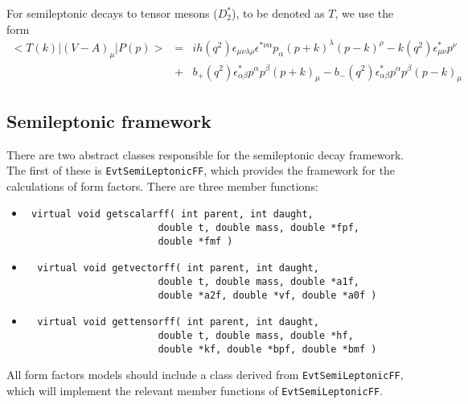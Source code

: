 \noindent For semileptonic decays to tensor mesons ($D_2^*$), to
be denoted as $T$, we use the form
\begin{eqnarray}
<T(k) \vert (V-A)_{\mu} \vert P(p) > &=& ih(q^2) \epsilon_{\mu \nu \lambda \rho}
\epsilon^{* \nu \alpha} p_{\alpha} (p+k)^{\lambda} (p-k)^{\rho} -
k(q^2) \epsilon^{*}_{\mu \nu} p^{\nu} \\
& + &b_+(q^2) \epsilon^*_{\alpha \beta} p^{\alpha} p^{\beta} (p+k)_{\mu} -
b_-(q^2) \epsilon^*_{\alpha \beta} p^{\alpha} p^{\beta} (p-k)_{\mu} 
\nonumber
\end{eqnarray}

\subsection{Semileptonic framework}
\label{sec:framework}
There are two abstract classes responsible for the semileptonic decay
framework.  The first of these is 
{\tt EvtSemiLeptonicFF}, which 
provides the framework for the calculations of form factors.  There
are three member functions:
\begin{itemize}
\item \begin{verbatim} virtual void getscalarff( int parent, int daught,
                       double t, double mass, double *fpf,
                       double *fmf ) 
\end{verbatim}
\item \begin{verbatim}  virtual void getvectorff( int parent, int daught,
                       double t, double mass, double *a1f,
                       double *a2f, double *vf, double *a0f ) 
\end{verbatim}
\item \begin{verbatim}  virtual void gettensorff( int parent, int daught,
                       double t, double mass, double *hf,
                       double *kf, double *bpf, double *bmf ) 
\end{verbatim}
\end{itemize}
\noindent All form factors models should include a class 
derived from {\tt EvtSemiLeptonicFF},  which
will implement the relevant member functions of
{\tt EvtSemiLeptonicFF}. 

